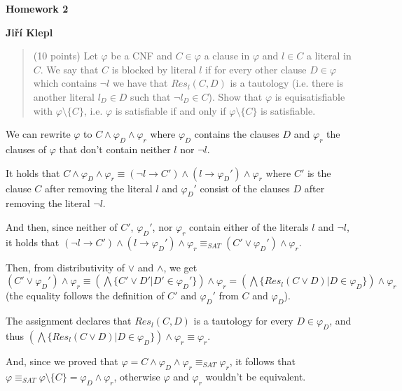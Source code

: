 \documentclass[a4paper,12pt]{article} %
\begin{document}
\begin{center}
    {\Large \bf Homework 2}
    \vspace{2mm}

    {\bf Jiří Klepl}

\end{center}

\vspace{0.4cm}

\begin{quote}
    (10 points) Let $\varphi$ be a CNF and $C \in \varphi$ a clause in $\varphi$ and $l \in C$ a literal in $C$. We say that $C$ is
blocked by literal $l$ if for every other clause $D \in \varphi$ which contains $\neg l$ we have that $Res_l(C, D)$ is a
tautology (i.e. there is another literal $l_D \in D$ such that $\neg l_D \in C$). Show that $\varphi$ is equisatisfiable with
$\varphi \setminus \{C\}$, i.e. $\varphi$ is satisfiable if and only if $\varphi \setminus \{C\}$ is satisfiable.
\end{quote}

We can rewrite $\varphi$ to $C \wedge \varphi_D \wedge \varphi_r$ where $\varphi_D$ contains the clauses $D$ and $\varphi_r$ the clauses of $\varphi$ that don't contain neither $l$ nor $\neg l$.


It holds that $C \wedge \varphi_D \wedge \varphi_r \equiv (\neg l \to C') \wedge (l \to \varphi_D') \wedge \varphi_r$ where $C'$ is the clause $C$ after removing the literal $l$ and $\varphi_D'$ consist of the clauses $D$ after removing the literal $\neg l$.

And then, since neither of $C'$, $\varphi_D'$, nor $\varphi_r$ contain either of the literals $l$ and $\neg l$, it holds that $(\neg l \to C') \wedge (l \to \varphi_D') \wedge \varphi_r \equiv_{SAT} (C' \vee \varphi_D') \wedge \varphi_r$.

Then, from distributivity of $\vee$ and $\wedge$, we get $(C' \vee \varphi_D') \wedge \varphi_r \equiv (\bigwedge \{C' \vee D' | D' \in \varphi_D'\}) \wedge \varphi_r = (\bigwedge \{Res_l(C \vee D) | D \in \varphi_D\}) \wedge \varphi_r$ (the equality follows the definition of $C'$ and $\varphi_D'$ from $C$ and $\varphi_D$).

The assignment declares that $Res_l(C, D)$ is a tautology for every $D \in \varphi_D$, and thus $(\bigwedge \{Res_l(C \vee D) | D \in \varphi_D\}) \wedge \varphi_r \equiv \varphi_r$.

And, since we proved that $\varphi = C \wedge \varphi_D \wedge \varphi_r \equiv_{SAT} \varphi_r$, it follows that $\varphi \equiv_{SAT} \varphi \setminus \{C\} = \varphi_D \wedge \varphi_r$, otherwise $\varphi$ and $\varphi_r$ wouldn't be equivalent.
\end{document}
